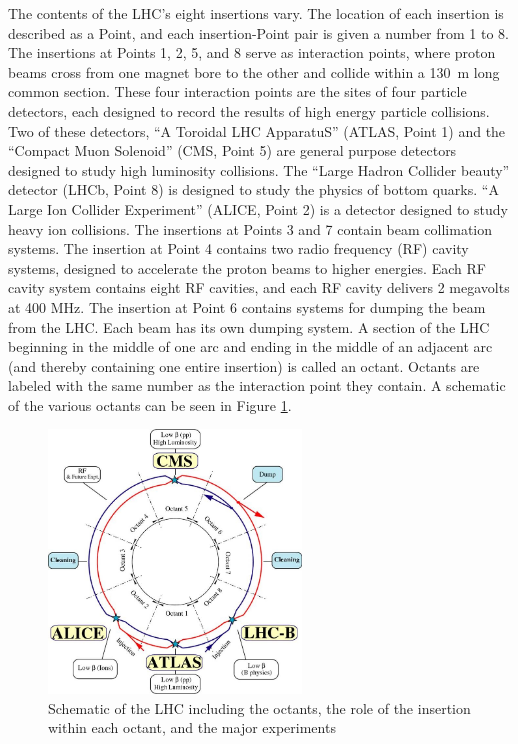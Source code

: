 The contents of the LHC's eight insertions vary.  
The location of each insertion is described as a Point, and each
insertion-Point pair is given a number from 1 to 8.
The insertions at Points 1, 2, 5, and 8 serve as interaction points,
where proton beams cross from one magnet bore to the other and collide within
a 130~m long common section.
These four interaction points are the sites of four particle detectors,
each designed to record the results of high energy particle collisions.
Two of these detectors, 
``A Toroidal LHC ApparatuS'' (ATLAS, Point 1) 
\cite{atlas-jinst}
and the ``Compact Muon Solenoid'' (CMS, Point 5) 
\cite{cms-jinst}
are general purpose detectors designed to study high luminosity collisions.
The ``Large Hadron Collider beauty'' detector (LHCb, Point 8) 
\cite{lhcb-jinst}
is designed to study the physics of bottom quarks.
``A Large Ion Collider Experiment'' (ALICE, Point 2) 
\cite{alice-jinst}
is a detector designed to study heavy ion collisions.
The insertions at Points 3 and 7 contain beam collimation systems.
The insertion at Point 4 contains two radio frequency (RF)
 cavity systems, designed
to accelerate the proton beams to higher energies.
Each RF cavity system contains eight RF cavities, and each RF cavity delivers
2 megavolts at 400 MHz. 
The insertion at Point 6 contains systems for dumping the beam from the LHC.  Each beam
has its own dumping system.
A section of the LHC beginning in the middle of one arc and ending in the middle
of an adjacent arc (and thereby containing one entire insertion) is called an octant.
Octants are labeled with the same number as the interaction point they contain.  
A schematic of the various octants can be seen in Figure \ref{fig:lhc-machine}.
\begin{figure}
  \centering
  \includegraphics[width=0.6\textwidth]{tex/lhc/fig/lhc-machine.jpg}
  \caption{Schematic of the LHC including the octants, the role
    of the insertion within each octant, and the major experiments \cite{lhc-jinst}}
  \label{fig:lhc-machine}
\end{figure}

